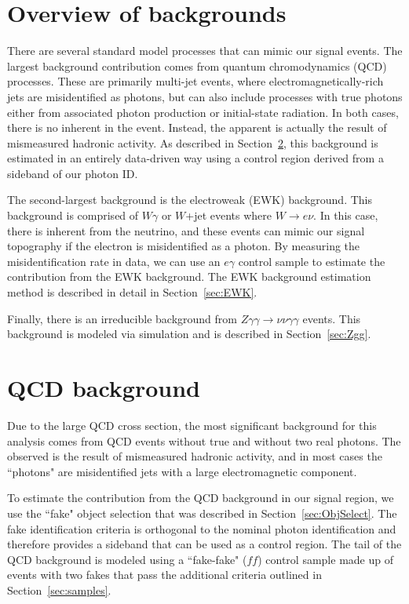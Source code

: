 \section{Overview of backgrounds}

There are several standard model processes that can mimic our signal events. The largest background contribution comes from quantum chromodynamics (QCD) processes. These are primarily multi-jet events, where electromagnetically-rich jets are misidentified as photons, but can also include processes with true photons either from associated photon production or initial-state radiation. In both cases, there is no inherent \ETmiss in the event. Instead, the apparent \ETmiss is actually the result of mismeasured hadronic activity. As described in Section~\ref{sec:QCD}, this background is estimated in an entirely data-driven way using a control region derived from a sideband of our photon ID. 

The second-largest background is the electroweak (EWK) background. This background is comprised of $W\gamma$ or $W$+jet events where $W\rightarrow e \nu$. In this case, there is inherent \ETmiss from the neutrino, and these events can mimic our signal topography if the electron is misidentified as a photon. By measuring the misidentification rate in data, we can use an $e\gamma$ control sample to estimate the contribution from the EWK background. The EWK background estimation method is described in detail in Section~\ref{sec:EWK}. 

Finally, there is an irreducible background from $Z\gamma\gamma\rightarrow\nu\nu\gamma\gamma$ events. This background is modeled via simulation and is described in Section~\ref{sec:Zgg}.


\section{QCD background}
\label{sec:QCD}

Due to the large QCD cross section, the most significant background for this analysis 
comes from QCD events without true \ETmiss and without two real photons. 
The observed \ETmiss is the result of mismeasured hadronic activity, and in most cases the 
``photons" are misidentified jets with a large electromagnetic component.

To estimate the contribution from the QCD background in our signal region, we use the ``fake" object selection that was described in Section~\ref{sec:ObjSelect}. The fake identification criteria is orthogonal to the nominal photon identification and therefore provides a sideband that can be used as a control region. The \ETmiss tail of the QCD background is modeled using a ``fake-fake" ($ff$) control sample made up of events with two fakes that pass the additional criteria outlined in Section~\ref{sec:samples}.

